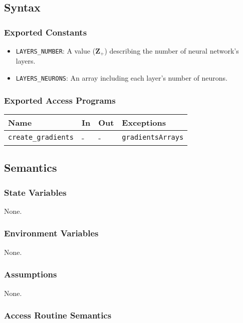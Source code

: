 \documentclass[12pt, titlepage]{article}
\def\code#1{\texttt{#1}}
\begin{document}
\subsection{Syntax}
\subsubsection{Exported Constants}
\begin{itemize}
  \item \code{LAYERS\_NUMBER}: A value ($\mathbf{Z}_{+}$) describing the number of 
  neural network's layers.
  \item \code{LAYERS\_NEURONS}: An array including each layer's number of neurons.
\end{itemize}

\subsubsection{Exported Access Programs}

\begin{center}
\begin{tabular}{p{3.5cm} p{4cm} p{4cm} p{3.5cm}}
\hline
\textbf{Name} & \textbf{In} & \textbf{Out} & \textbf{Exceptions} \\
\hline
\code{create\_gradients} & - & - & \code{gradientsArrays} \\
\hline
\end{tabular}
\end{center}

\subsection{Semantics}

\subsubsection{State Variables}
None.

\subsubsection{Environment Variables}
None.

\subsubsection{Assumptions}
None.

\subsubsection{Access Routine Semantics}
\end{document}
